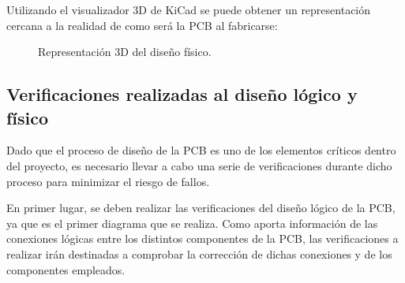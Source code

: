 Utilizando el visualizador 3D de KiCad se puede obtener un representación cercana a la realidad de como será la \ac{PCB} al fabricarse:

\begin{figure}[htbp]
    \centering
    \hfill
    \caption{Representación 3D del diseño físico.} 
    \label{fig:lego}
\end{figure}
    
\subsection{Verificaciones realizadas al diseño lógico y físico}

Dado que el proceso de diseño de la \ac{PCB} es uno de los elementos críticos dentro del proyecto, es necesario llevar a cabo una serie de verificaciones durante dicho proceso para minimizar el riesgo de fallos.

En primer lugar, se deben realizar las verificaciones del diseño lógico de la \ac{PCB}, ya que es el primer diagrama que se realiza. Como aporta información de las conexiones lógicas entre los distintos componentes de la \ac{PCB}, las verificaciones a realizar irán destinadas a comprobar la corrección de dichas conexiones y de los componentes empleados.

